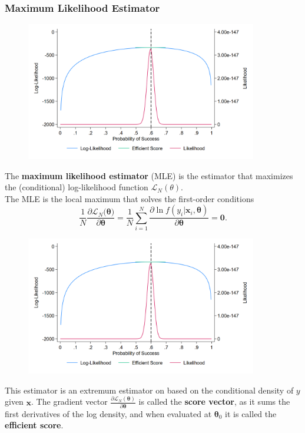 \documentclass[a4paper,12pt]{article}
\begin{document}
\vspace{-20pt}
\subsubsection*{Maximum Likelihood Estimator}

\begin{figure}[H]
\begin{center}
{\includegraphics[width=0.9\textwidth]{figures/ll_500}}\label{f1}
\end{center}
\end{figure}
The \textbf{maximum likelihood estimator} (MLE) is the estimator that maximizes the (conditional) log-likelihood function $\mathcal{L}_N(\theta)$.\\ The MLE is the local maximum that solves the first-order conditions
$$\frac{1}{N}\frac{\partial \mathcal{L}_N(\boldsymbol{\theta)}}{\partial \boldsymbol{\theta}}=\frac{1}{N}\sum_{i=1}^{N}\frac{\partial \ln f(y_i|\boldsymbol{x}_i,\boldsymbol{\theta})}{\partial \boldsymbol{\theta}}=\boldsymbol{0}.$$


\begin{figure}[H]
\begin{center}
{\includegraphics[width=0.9\textwidth]{figures/ll_500}}\label{f1}
\end{center}
\end{figure}
This estimator is an extremum estimator on based on the conditional density of $y$ given $\boldsymbol{x}$.
The gradient vector $\frac{\partial \mathcal{L}_N(\boldsymbol{\theta})}{\partial \boldsymbol{\theta}}$ is called the \textbf{score vector}, as it sums the first derivatives of the log density, and when evaluated at $\boldsymbol{\theta}_0$ it is called the \textbf{efficient score}.
\end{document}
